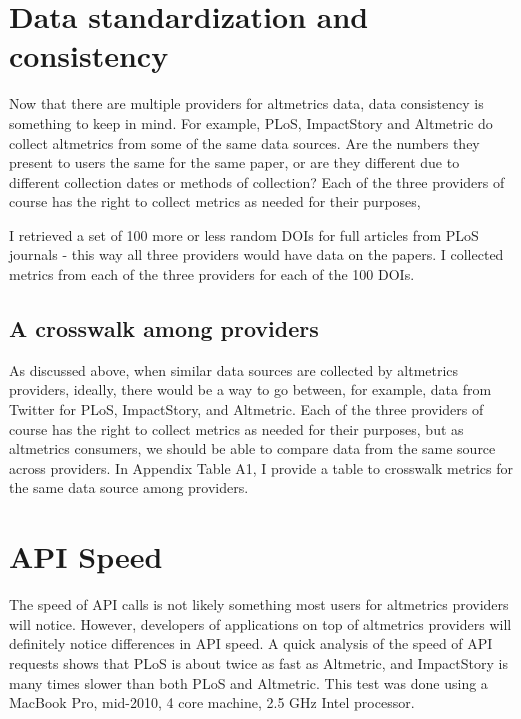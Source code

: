 \documentclass[letterpaper,superscriptaddress,showkeys,longbibliography]{revtex4-1}
\begin{document}
\section{Data standardization and consistency}

Now that there are multiple providers for altmetrics data, data consistency is something to keep in mind. For example, PLoS, ImpactStory and Altmetric do collect altmetrics from some of the same data sources. Are the numbers they present to users the same for the same paper, or are they different due to different collection dates or methods of collection? Each of the three providers of course has the right to collect metrics as needed for their purposes, 

I retrieved a set of 100 more or less random DOIs for full articles from PLoS journals - this way all three providers would have data on the papers. I collected metrics from each of the three providers for each of the 100 DOIs. 


\subsection*{A crosswalk among providers}

As discussed above, when similar data sources are collected by altmetrics providers, ideally, there would be a way to go between, for example, data from Twitter for PLoS, ImpactStory, and Altmetric. Each of the three providers of course has the right to collect metrics as needed for their purposes, but as altmetrics consumers, we should be able to compare data from the same source across providers. In Appendix Table A1, I provide a table to crosswalk metrics for the same data source among providers.

\section{API Speed}

The speed of API calls is not likely something most users for altmetrics providers will notice. However, developers of applications on top of altmetrics providers will definitely notice differences in API speed. A quick analysis of the speed of API requests shows that PLoS is about twice as fast as Altmetric, and ImpactStory is many times slower than both PLoS and Altmetric. This test was done using a MacBook Pro, mid-2010, 4 core machine, 2.5 GHz Intel processor. 

\end{document}
